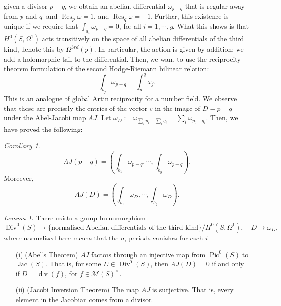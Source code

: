 \documentclass[a4paper]{report}
\theoremstyle{definition}
\theoremstyle{remark}
\theoremstyle{proposition}
\theoremstyle{conjecture}
\theoremstyle{lemma}
\newtheorem{lemma}{Lemma}
\theoremstyle{corollary}
\newtheorem{corollary}{Corollary}
\theoremstyle{exercise}
\theoremstyle{example}
\newcommand{\mcal}{\mathcal}
\newcommand{\on}{\operatorname}
\begin{document}
given a divisor $p-q$, we obtain an abelian differential 
$\omega_{p-q}$ that is regular away from $p$ and $q$, and 
$\on{Res}_p\omega =1$, and $\on{Res}_q \omega = -1$.
Further, this existence is unique if we require that 
$\int_{a_i} \omega_{p-q} = 0$, for all $i=1,\cdots,g$.
What this shows is that $H^0(S,\Omega^1)$ acts transitively on the 
space of all abelian differentials of the third kind, 
denote this by $\Omega^{3rd}(p)$. In particular, the action is given by 
addition: we add a holomorphic tail to the differential. 
Then, we want to use the reciprocity theorem formulation of the second 
Hodge-Riemann bilinear relation:
$$\int_{b_j}\omega_{p-q} = \int_p^q \omega_j.$$
This is an analogue of global Artin reciprocity for a number field.
We observe that these are precisely the entries of the vector $v$ in the image
of $D=p-q$ under the Abel-Jacobi map $AJ$.
Let $\omega_D := \omega_{\sum_ip_i-\sum_iq_i} = \sum_i\omega_{p_i-q_i}$.
Then, we have proved the following:
\begin{corollary}
    $$AJ(p-q) = \left(\int_{b_1}\omega_{p-q},\cdots,\int_{b_g}\omega_{p-q}\right).$$
    Moreover,
    $$AJ(D) = \left(\int_{b_1}\omega_D,\cdots,\int_{b_g}\omega_D\right).$$
\end{corollary}

\begin{lemma}
    There exists a group homomorphism
    $$\on{Div}^0(S) \longrightarrow \lbrace \text{normalised Abelian differentials of the third kind}\rbrace/H^0(S,\Omega^1),\quad D \longmapsto \omega_D,$$
    where normalised here means that the $a_i$-periods vanishes for each 
    $i$.
\end{lemma}

\begin{theorem}
    \leavevmode
    \begin{itemize}
        \item[(i)] (Abel's Theorem) $AJ$ factors through an injective map 
            from $\on{Pic}^0(S)$ to $\on{Jac}(S)$. That is,
            for some $D \in \on{Div}^0(S)$, then 
            $AJ(D) =0$ if and only if $D = \on{div}(f)$, for 
            $f\in \mcal{M}(S)^\times$.
        \item[(ii)] (Jacobi Inversion Theorem)
            The map $AJ$ is surjective. That is, every element in the 
            Jacobian comes from a divisor.
    \end{itemize}
\end{theorem}
\end{document}
